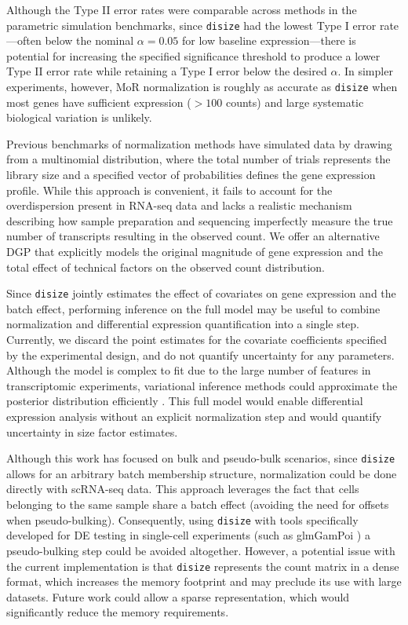 \documentclass[10pt,letterpaper]{article}
\begin{document}
Although the Type II error rates were comparable across methods in the parametric simulation benchmarks, since \texttt{disize} had the lowest Type I error rate---often below the nominal $\alpha = 0.05$ for low baseline expression---there is potential for increasing the specified significance threshold to produce a lower Type II error rate while retaining a Type I error below the desired $\alpha$.
In simpler experiments, however, MoR normalization is roughly as accurate as \texttt{disize} when most genes have sufficient expression ($> 100$ counts) and large systematic biological variation is unlikely.

Previous benchmarks of normalization methods \cite{robinson_scaling_2010, li_choice_2020} have simulated data by drawing from a multinomial distribution, where the total number of trials represents the library size and a specified vector of probabilities defines the gene expression profile. 
While this approach is convenient, it fails to account for the overdispersion present in RNA-seq data and lacks a realistic mechanism describing how sample preparation and sequencing imperfectly measure the true number of transcripts resulting in the observed count.
We offer an alternative DGP that explicitly models the original magnitude of gene expression and the total effect of technical factors on the observed count distribution.

Since \texttt{disize} jointly estimates the effect of covariates on gene expression and the batch effect, performing inference on the full model may be useful to combine normalization and differential expression quantification into a single step.
Currently, we discard the point estimates for the covariate coefficients specified by the experimental design, and do not quantify uncertainty for any parameters.
Although the model is complex to fit due to the large number of features in transcriptomic experiments, variational inference methods could approximate the posterior distribution efficiently \cite{blei_variational_2017}. 
This full model would enable differential expression analysis without an explicit normalization step and would quantify uncertainty in size factor estimates.

Although this work has focused on bulk and pseudo-bulk scenarios, since \texttt{disize} allows for an arbitrary batch membership structure, normalization could be done directly with scRNA-seq data. 
This approach leverages the fact that cells belonging to the same sample share a batch effect (avoiding the need for offsets when pseudo-bulking). 
Consequently, using \texttt{disize} with tools specifically developed for DE testing in single-cell experiments (such as glmGamPoi \cite{ahlmann-eltze_glmgampoi_2021}) a pseudo-bulking step could be avoided altogether. 
However, a potential issue with the current implementation is that \texttt{disize} represents the count matrix in a dense format, which increases the memory footprint and may preclude its use with large datasets. 
Future work could allow a sparse representation, which would significantly reduce the memory requirements.
\end{document}
